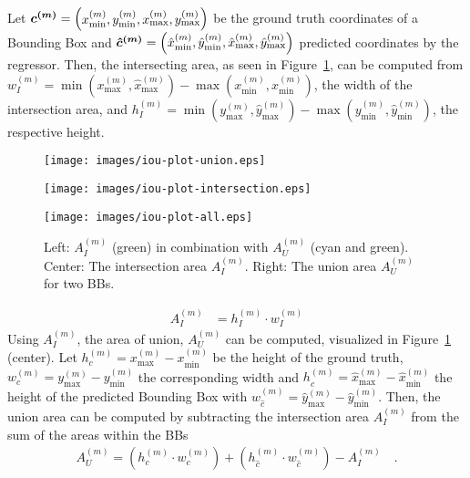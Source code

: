 Let
$
\bm{c^{(m)}} = \begin{pmatrix}
        x^{(m)}_{\min},
        y^{(m)}_{\min},
        x^{(m)}_{\max},
        y^{(m)}_{\max}
\end{pmatrix}
$ be the ground truth coordinates of a Bounding Box
and
$\bm{\hat{c}^{(m)}}=    \left(\hat{x}^{(m)}_{\min},\hat{y}^{(m)}_{\min},\hat{x}^{(m)}_{\max}, \hat{y}^{(m)}_{\max}\right)$
predicted coordinates by the regressor.
Then, the intersecting area, as seen in Figure~\ref{fig:iou}, can be computed from $w^{(m)}_I = \min(x^{(m)}_{\max}, \hat{x}^{(m)}_{\max}) - \max(x^{(m)}_{\min}, \hat{x}^{(m)}_{\min})$, the width of the intersection area, and $h^{(m)}_I = \min(y^{(m)}_{\max}, \hat{y}^{(m)}_{\max})-\max(y^{(m)}_{\min}, \hat{y}^{(m)}_{\min})$, the respective height.

\begin{figure}[!ht]
    \centering
\begin{minipage}{0.28\textwidth}
    \texttt{[image: images/iou-plot-union.eps]}
\end{minipage}
\begin{minipage}{0.28\textwidth}
    \texttt{[image: images/iou-plot-intersection.eps]}
\end{minipage}
\begin{minipage}{0.28\textwidth}
    \texttt{[image: images/iou-plot-all.eps]}
    \end{minipage}
    \caption{Left: $A^{(m)}_I$ (green) in combination with $A^{(m)}_U$ (cyan and green). Center: The intersection area $A^{(m)}_I$. Right: The union area $A^{(m)}_U$ for two BBs.}
    \label{fig:iou}
\end{figure}
\begin{align}
    A^{(m)}_I &= h^{(m)}_I \cdot w^{(m)}_I
\end{align}
Using $A^{(m)}_I$, the area of union, $A^{(m)}_U$ can be computed, visualized in Figure~\ref{fig:iou} (center).
Let $h^{(m)}_c = x^{(m)}_{\max}-x^{(m)}_{\min}$ be the height of the ground truth, $w^{(m)}_c = y^{(m)}_{\max}-y^{(m)}_{\min}$ the corresponding width and $h^{(m)}_{\hat{c}}=\hat{x}^{(m)}_{\max}-\hat{x}^{(m)}_{\min}$ the height of the predicted Bounding Box with $w^{(m)}_{\hat{c}} = \hat{y}^{(m)}_{\max}-\hat{y}^{(m)}_{\min}$.
Then, the union area can be computed by subtracting the intersection area $A^{(m)}_I$ from the sum of the areas within the BBs
\begin{align}
    A^{(m)}_U = (h^{(m)}_c\cdot w^{(m)}_c) + (h^{(m)}_{\hat{c}} \cdot w^{(m)}_{\hat{c}}) - A^{(m)}_I\quad .
\end{align}

